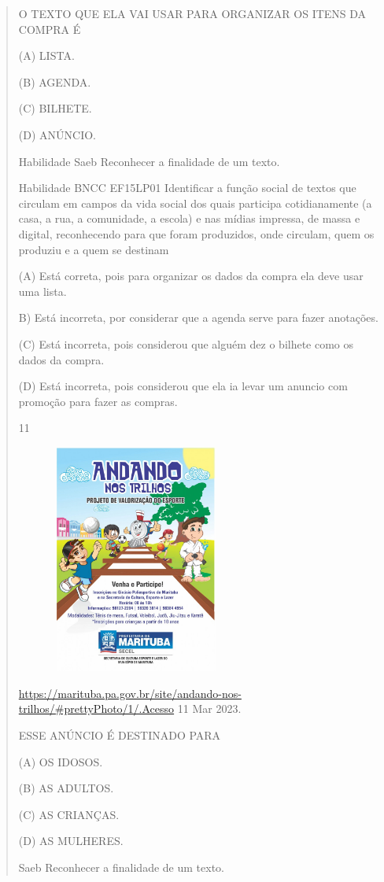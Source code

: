 {{{{\begin{verse}
{{\begin{escolha}
{{{{{O TEXTO QUE ELA VAI USAR PARA ORGANIZAR OS ITENS DA COMPRA É

(A) LISTA.

(B) AGENDA.

(C) BILHETE.

(D) ANÚNCIO.

Habilidade Saeb Reconhecer a finalidade de um texto.

Habilidade BNCC EF15LP01 Identificar a função social de textos que
circulam em campos da vida social dos quais participa cotidianamente (a
casa, a rua, a comunidade, a escola) e nas mídias impressa, de massa e
digital, reconhecendo para que foram produzidos, onde circulam, quem os
produziu e a quem se destinam

(A) Está correta, pois para organizar os dados da compra ela deve usar
uma lista.

B) Está incorreta, por considerar que a agenda serve para fazer
anotações.

(C) Está incorreta, pois considerou que alguém dez o bilhete como os
dados da compra.

(D) Está incorreta, pois considerou que ela ia levar um anuncio com
promoção para fazer as compras.

\num{11}

\includegraphics[width=3.11515in,height=2.97237in]{media/image170.jpeg}

\url{https://marituba.pa.gov.br/site/andando-nos-trilhos/\#prettyPhoto/1/.Acesso}
11 Mar 2023.

ESSE ANÚNCIO É DESTINADO PARA

(A) OS IDOSOS.

(B) AS ADULTOS.

(C) AS CRIANÇAS.

(D) AS MULHERES.

Saeb Reconhecer a finalidade de um texto.

}}}}}
\end{escolha}}}
\end{verse}}}}}
